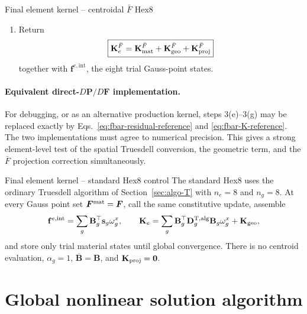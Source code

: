 \documentclass[11pt,a4paper]{article}
\newcommand{\bs}[1]{\boldsymbol{#1}}
\newcommand{\F}{\bs{F}}
\newcommand{\Pstress}{\bs{P}}
\newcommand{\sigb}{\overline{\bs{\sigma}}}
\newcommand{\vct}[1]{\mathbf{#1}}
\begin{document}
\begin{algorithmbox}{Final element kernel -- centroidal $\bar F$ Hex8}
\begin{enumerate}[leftmargin=1.7em,label=\arabic*.,itemsep=0.18em,topsep=0.2em]
\begin{enumerate}[leftmargin=1.5em,label=\alph*.,itemsep=0.12em,topsep=0.1em]
\[  \]
  \item With $\omega_g^x=\det\vct J_{x,g}W_g$, accumulate
  \[
  \vct f^{e,\mathrm{int}}\mathrel{+}=\vct B_g^\top\overline{\vct s}_g\omega_g^x,
  \]
  \[
  \vct K_{\rm mat}^{\bar F}\mathrel{+}=\vct B_g^\top\overline{\vct D}^{\mathrm{T,alg}}_g\overline{\vct B}_g\omega_g^x,
  \]
  the ordinary geometric blocks using $\sigb_g$, and
  \[
  \vct K_{\rm proj,AB}^{\bar F}\mathrel{+}=
  -\left(\sigb_g\nabla_xN_A\right)\otimes\bs q_{B,g}\,\omega_g^x.
  \]
  \item Store the returned Gauss-point state as trial state only.
  \end{enumerate}
\item Return
\[
\boxed{
\vct K_e^{\bar F}
=\vct K_{\rm mat}^{\bar F}
+\vct K_{\rm geo}^{\bar F}
+\vct K_{\rm proj}^{\bar F}}
\]
together with $\vct f^{e,\mathrm{int}}$, the eight trial Gauss-point states.
\end{enumerate}
\end{algorithmbox}

\paragraph*{Equivalent direct-$D\Pstress/D\F$ implementation.}
For debugging, or as an alternative production kernel, steps 3(e)--3(g) may be replaced exactly by Eqs.~\eqref{eq:fbar-residual-reference} and \eqref{eq:fbar-K-reference}. The two implementations must agree to numerical precision. This gives a strong element-level test of the spatial Truesdell conversion, the geometric term, and the $\bar F$ projection correction simultaneously.

\begin{algorithmbox}{Final element kernel -- standard Hex8 control}
The standard Hex8 uses the ordinary Truesdell algorithm of Section~\ref{sec:algo-T} with $n_e=8$ and $n_g=8$. At every Gauss point set $\F^{\rm mat}=\F$, call the same constitutive update, assemble
\[
\vct f^{e,\mathrm{int}}=\sum_g\vct B_g^\top\vct s_g\omega_g^x,
\qquad
\vct K_e=\sum_g\vct B_g^\top\vct D_g^{\mathrm{T,alg}}\vct B_g\omega_g^x+\vct K_{\rm geo},
\]
and store only trial material states until global convergence. There is no centroid evaluation, $\alpha_g=1$, $\overline{\vct B}=\vct B$, and $\vct K_{\rm proj}=\vct0$.
\end{algorithmbox}


\section{Global nonlinear solution algorithm}
\label{sec:final-global-algorithm}
\end{document}
